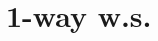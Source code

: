 \documentclass[9pt,pdf,utf8,hyperref={unicode},aspectratio=169]{beamer}
\begin{document}
%                     
%    		
%    		 

\section{1-way w.s.}
\end{document}

